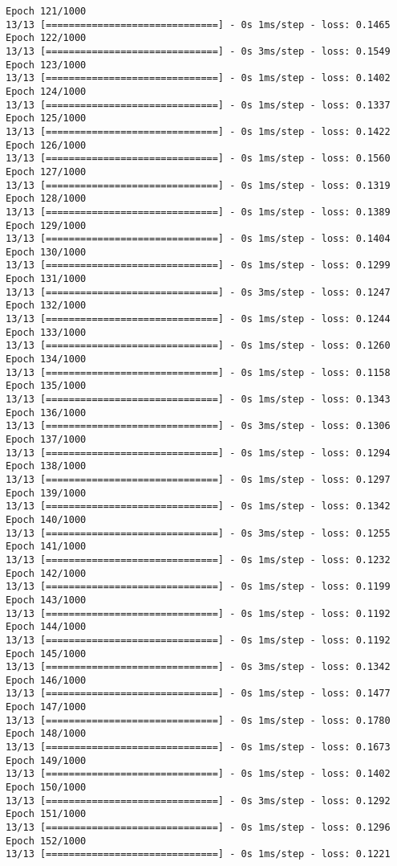 \documentclass[11pt]{article}
\begin{document}
\begin{Verbatim}[commandchars=\\\{\}]
Epoch 121/1000
13/13 [==============================] - 0s 1ms/step - loss: 0.1465
Epoch 122/1000
13/13 [==============================] - 0s 3ms/step - loss: 0.1549
Epoch 123/1000
13/13 [==============================] - 0s 1ms/step - loss: 0.1402
Epoch 124/1000
13/13 [==============================] - 0s 1ms/step - loss: 0.1337
Epoch 125/1000
13/13 [==============================] - 0s 1ms/step - loss: 0.1422
Epoch 126/1000
13/13 [==============================] - 0s 1ms/step - loss: 0.1560
Epoch 127/1000
13/13 [==============================] - 0s 1ms/step - loss: 0.1319
Epoch 128/1000
13/13 [==============================] - 0s 1ms/step - loss: 0.1389
Epoch 129/1000
13/13 [==============================] - 0s 1ms/step - loss: 0.1404
Epoch 130/1000
13/13 [==============================] - 0s 1ms/step - loss: 0.1299
Epoch 131/1000
13/13 [==============================] - 0s 3ms/step - loss: 0.1247
Epoch 132/1000
13/13 [==============================] - 0s 1ms/step - loss: 0.1244
Epoch 133/1000
13/13 [==============================] - 0s 1ms/step - loss: 0.1260
Epoch 134/1000
13/13 [==============================] - 0s 1ms/step - loss: 0.1158
Epoch 135/1000
13/13 [==============================] - 0s 1ms/step - loss: 0.1343
Epoch 136/1000
13/13 [==============================] - 0s 3ms/step - loss: 0.1306
Epoch 137/1000
13/13 [==============================] - 0s 1ms/step - loss: 0.1294
Epoch 138/1000
13/13 [==============================] - 0s 1ms/step - loss: 0.1297
Epoch 139/1000
13/13 [==============================] - 0s 1ms/step - loss: 0.1342
Epoch 140/1000
13/13 [==============================] - 0s 3ms/step - loss: 0.1255
Epoch 141/1000
13/13 [==============================] - 0s 1ms/step - loss: 0.1232
Epoch 142/1000
13/13 [==============================] - 0s 1ms/step - loss: 0.1199
Epoch 143/1000
13/13 [==============================] - 0s 1ms/step - loss: 0.1192
Epoch 144/1000
13/13 [==============================] - 0s 1ms/step - loss: 0.1192
Epoch 145/1000
13/13 [==============================] - 0s 3ms/step - loss: 0.1342
Epoch 146/1000
13/13 [==============================] - 0s 1ms/step - loss: 0.1477
Epoch 147/1000
13/13 [==============================] - 0s 1ms/step - loss: 0.1780
Epoch 148/1000
13/13 [==============================] - 0s 1ms/step - loss: 0.1673
Epoch 149/1000
13/13 [==============================] - 0s 1ms/step - loss: 0.1402
Epoch 150/1000
13/13 [==============================] - 0s 3ms/step - loss: 0.1292
Epoch 151/1000
13/13 [==============================] - 0s 1ms/step - loss: 0.1296
Epoch 152/1000
13/13 [==============================] - 0s 1ms/step - loss: 0.1221

\end{Verbatim}
\end{document}
